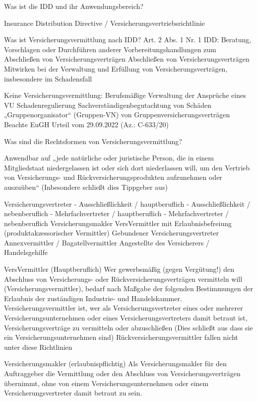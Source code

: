 Was ist die IDD und ihr Anwendungsbereich?

Insurance Distribution Directive / Versicherungsvertriebsrichtlinie

Was ist Versicherungsvermittlung nach IDD?
Art. 2 Abs. 1 Nr. 1 IDD: 
Beratung, Vorschlagen oder Durchführen anderer Vorbereitungshandlungen zum Abschließen von Versicherungsverträgen
Abschließen von Versicherungsverträgen
Mitwirken bei der Verwaltung und Erfüllung von Versicherungsverträgen, insbesondere im Schadensfall

Keine Versicherungsvermittlung:
Berufsmäßige Verwaltung der Ansprüche eines VU
Schadenregulierung
Sachverständigenbegutachtung von Schäden
„Gruppenorganisator“ (Gruppen-VN) von Gruppenversicherungsverträgen 
Beachte EuGH Urteil vom 29.09.2022 (Az.: C-633/20) 


Was sind die Rechtsformen von Versicherungsvermittlung?

Anwendbar auf „jede natürliche oder juristische Person, die in einem Mitgliedstaat niedergelassen ist 
oder sich dort niederlassen will, um den Vertrieb von Versicherungs- und Rückversicherungsprodukten aufzunehmen oder auszuüben“
(Inbesondere schließt dies Tippgeber aus)

Versicherungsvertreter
- Ausschließlichkeit / hauptberuflich
- Ausschließlichkeit / nebenberuflich
- Mehrfachvertreter / hauptberuflich
- Mehrfachvertreter / nebenberuflich
Versicherungsmakler
VersVermittler mit Erlaubnisbefreiung (produktakzessorischer Vermittler)
Gebundener Versicherungsvertreter
Annexvermittler / Bagatellvermittler
Angestellte des Versicherers / Handelsgehilfe

VersVermittler (Hauptberuflich)
Wer gewerbsmäßig (gegen Vergütung!) den Abschluss von Versicherungs- oder Rückversicherungsverträgen vermitteln will (Versicherungsvermittler), 
bedarf nach Maßgabe der folgenden Bestimmungen der Erlaubnis der zuständigen Industrie- und Handelskammer. 
Versicherungsvermittler ist, wer 
als Versicherungsvertreter eines oder mehrerer Versicherungsunternehmen oder eines Versicherungsvertreters damit betraut ist, 
Versicherungsverträge zu vermitteln oder abzuschließen
(Dies schließt aus dass sie ein Versicherungsunternehmen sind)
Rückversicherungsvermittler fallen nicht unter diese Richtlinien

Versicherungsmakler (erlaubnispflichtig)
Als Versicherungsmakler für den Auftraggeber die Vermittlung oder den Abschluss von Versicherungsverträgen übernimmt, 
ohne von einem Versicherungsunternehmen oder einem Versicherungsvertreter damit betraut zu sein.

